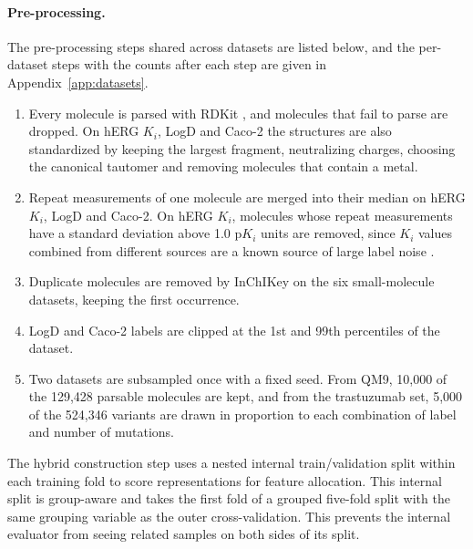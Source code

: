 \paragraph{Pre-processing.} The pre-processing steps shared across datasets are listed below, and the per-dataset steps with the counts after each step are given in Appendix~\ref{app:datasets}.
\begin{enumerate}[leftmargin=*]
    \item Every molecule is parsed with RDKit \citep{rdkit}, and molecules that fail to parse are dropped. On hERG $K_i$, LogD and Caco-2 the structures are also standardized by keeping the largest fragment, neutralizing charges, choosing the canonical tautomer and removing molecules that contain a metal.
    \item Repeat measurements of one molecule are merged into their median on hERG $K_i$, LogD and Caco-2. On hERG $K_i$, molecules whose repeat measurements have a standard deviation above 1.0 p$K_i$ units are removed, since $K_i$ values combined from different sources are a known source of large label noise \citep{landrum2024}.
    \item Duplicate molecules are removed by InChIKey on the six small-molecule datasets, keeping the first occurrence.
    \item LogD and Caco-2 labels are clipped at the 1st and 99th percentiles of the dataset.
    \item Two datasets are subsampled once with a fixed seed. From QM9, 10,000 of the 129,428 parsable molecules are kept, and from the trastuzumab set, 5,000 of the 524,346 variants are drawn in proportion to each combination of label and number of mutations.
\end{enumerate}

The hybrid construction step uses a nested internal train/validation split within each training fold to score representations for feature allocation. This internal split is group-aware and takes the first fold of a grouped five-fold split with the same grouping variable as the outer cross-validation. This prevents the internal evaluator from seeing related samples on both sides of its split.


